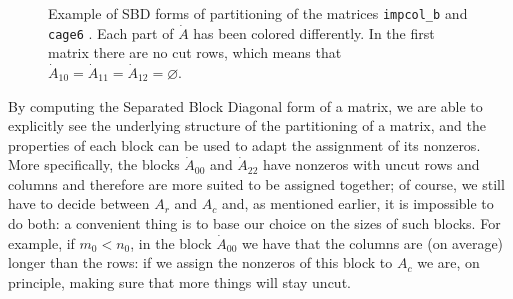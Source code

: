 \begin{figure}[h]
	\caption{Example of SBD forms of partitioning of the matrices \texttt{impcol\_b} \cite{matrixmarket} and \texttt{cage6} \cite{ufl}. Each part of $\dot{A}$ has been colored differently. In the first matrix there are no cut rows, which means that $\dot{A}_{10}=\dot{A}_{11} =\dot{A}_{12} = \varnothing$.} \label{fig:sbd-2}
\end{figure}

By computing the Separated Block Diagonal form of a matrix, we are able to explicitly see the underlying structure of the partitioning of a matrix, and the properties of each block can be used to adapt the assignment of its nonzeros. More specifically, the blocks $\dot{A}_{00}$ and $\dot{A}_{22}$ have nonzeros with uncut rows and columns and therefore are more suited to be assigned together; of course, we still have to decide between $A_r$ and $A_c$ and, as mentioned earlier, it is impossible to do both: a convenient thing is to base our choice on the sizes of such blocks. For example, if $m_0 < n_0$, in the block $\dot{A}_{00}$ we have that the columns are (on average) longer than the rows: if we assign the nonzeros of this block to $A_c$ we are, on principle, making sure that more things will stay uncut.

